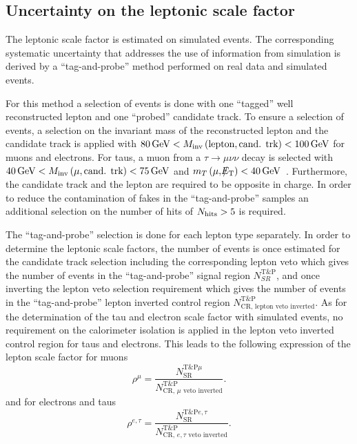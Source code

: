 \subsection{Uncertainty on the leptonic scale factor}
\label{sec:LeptonScaleUncertainty}

The leptonic scale factor \leptonscalefactor is estimated on simulated \WJets events.
The corresponding systematic uncertainty that addresses the use of information from simulation is derived by a ``tag-and-probe'' method performed on real data and simulated events.

For this method a selection of \Zlep events is done with one ``tagged'' well reconstructed lepton and one ``probed'' candidate track.
To ensure a selection of \Zlep events, a selection on the invariant mass of  the reconstructed lepton and the candidate track is applied with $80\,\text{Ge}\kern-0.06667em\text{V}<M_{\text{inv}}\left( \text{lepton}, \text{cand. trk}  \right)<100\,\text{Ge}\kern-0.06667em\text{V}$ for muons and electrons.
For taus, a muon from a $\tau\rightarrow\mu\nu\nu$ decay is selected with $40\,\text{Ge}\kern-0.06667em\text{V}<M_{\text{inv}}\left( \mu, \text{cand. trk}  \right)<75\,\text{Ge}\kern-0.06667em\text{V}$ and $m_T\left(\mu,\slash\mkern-12mu{E}_{\text{T}}\right)<40\,\text{Ge}\kern-0.06667em\text{V}$~\cite{bib:CMS:DT_Thesis,bib:CMS:DT_8TeV_AN}.
Furthermore, the candidate track and the lepton are required to be opposite in charge.
In order to reduce the contamination of fakes in the ``tag-and-probe'' samples an additional selection on the number of hits of $N_{\text{hits}}>5$ is required.

The ``tag-and-probe'' selection is done for each lepton type separately.
In order to determine the leptonic scale factors, the number of events is once estimated for the candidate track selection including the corresponding lepton veto which gives the number of events in the ``tag-and-probe'' signal region $N_{SR}^{\text{T\&P}}$, and once inverting the lepton veto selection requirement which gives the number of events in the ``tag-and-probe'' lepton inverted control region $N_{\text{CR, lepton veto inverted}}^{\text{T\&P}}$.
As for the determination of the tau and electron scale factor with simulated \WJets events, no requirement on the calorimeter isolation is applied in the lepton veto inverted control region for taus and electrons.
This leads to the following expression of the lepton scale factor for muons
\begin{equation*}
\rho^{\mu} = \frac{N_{\text{SR}}^{\text{T\&P}\mu}}{N_{\text{CR, }\mu\text{ veto inverted}}^{\text{T\&P}}}.
\end{equation*}
and for electrons and taus 
\begin{equation*}
\rho^{e,\tau} = \frac{N_{\text{SR}}^{\text{T\&P}e,\tau}}{N_{\text{CR, }e,\tau \text{ veto inverted}}^{\text{T\&P}}}.
\end{equation*}

